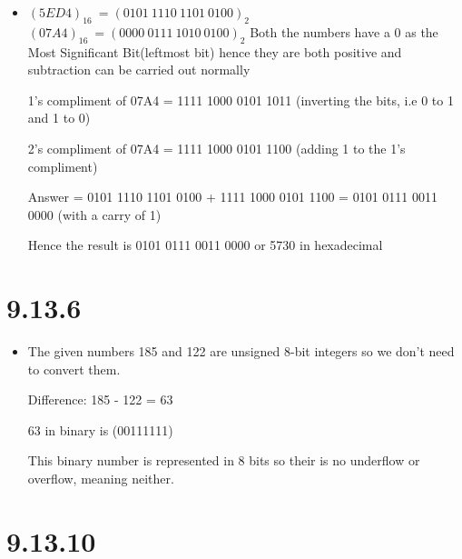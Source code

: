 \documentclass{article}
\begin{document}
\begin{itemize}
    \item $(5ED4)_{16}\ = (0101\ 1110\ 1101\ 0100)_2$ \newline
    $(07A4)_{16}\ = (0000\ 0111\ 1010\ 0100)_2$ \newline
    Both the numbers have a 0 as the Most Significant Bit(leftmost bit) hence they are both positive and subtraction can be carried out normally \newline 
    
    1's compliment of 07A4 = 1111 1000 0101 1011 (inverting the bits, i.e 0 to 1 and 1 to 0) \newline
    
    2's compliment of 07A4 = 1111 1000 0101 1100 (adding 1 to the 1's compliment)\newline
    
    Answer = 0101 1110 1101 0100 + 1111 1000 0101 1100 = 0101 0111 0011 0000 (with a carry of 1) \newline
    
    Hence the result is 0101 0111 0011 0000 or 5730 in hexadecimal \newline
\end{itemize}

\section{9.13.6}
\large

\begin{itemize}
    \item The given numbers 185 and 122 are unsigned 8-bit integers so we don't need to convert them. \newline
    
    Difference: 185 - 122 = 63 \newline
    
    63 in binary is (00111111) \newline
    
    This binary number is represented in 8 bits so their is no underflow or overflow, meaning neither. \newline
\end{itemize}

\section{9.13.10}
\large
\end{document}
